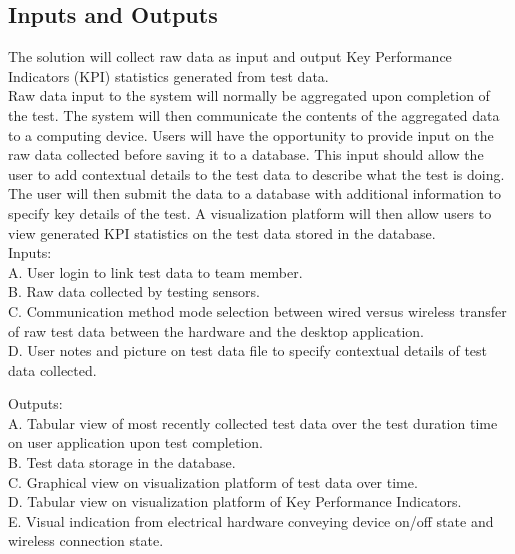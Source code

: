 \documentclass[12pt,titlepage]{article}
\begin{document}
\subsection{Inputs and Outputs}


The solution will collect raw data as input and output Key Performance Indicators (KPI) statistics generated from test data. \\

Raw data input to the system will normally be aggregated upon completion of the test. The system will then communicate the contents of the aggregated data to a computing device. Users will have the opportunity to provide input on the raw data collected before saving it to a database. This input should allow the user to add contextual details to the test data to describe what the test is doing. The user will then submit the data to a database with additional information to specify key details of the test. A visualization platform will then allow users to view generated KPI statistics on the test data stored in the database. \\

Inputs: \\
A. User login to link test data to team member. \\
B. Raw data collected by testing sensors. \\
C. Communication method mode selection between wired versus wireless transfer of raw test data between the hardware and the desktop application. \\
D. User notes and picture on test data file to specify contextual details of test data collected. 

\newpage

Outputs: \\
A. Tabular view of most recently collected test data over the test duration time on user application upon test completion. \\
B. Test data storage in the database. \\
C. Graphical view on visualization platform of test data over time. \\
D. Tabular view on visualization platform of Key Performance Indicators. \\
E. Visual indication from electrical hardware conveying device on/off state and wireless connection state. 
\end{document}
